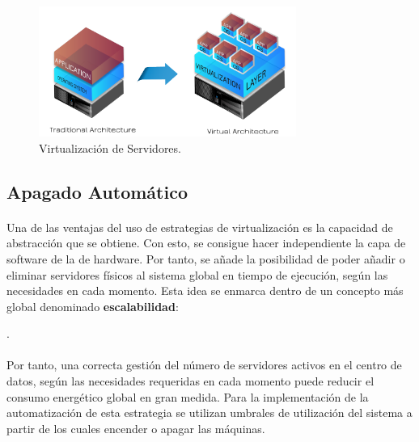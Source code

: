 \documentclass[10pt]{article}
\begin{document}
			\begin{figure}[htpb!]
				\begin{center}
					\includegraphics[width=0.75\textwidth]{virtualization}
					\caption{Virtualización de Servidores.\cite{exelos:virtualization}}
					\label{image:virtualization}
				\end{center}
			\end{figure}

		\subsection{Apagado Automático}

			\paragraph{}
			Una de las ventajas del uso de estrategias de virtualización es la capacidad de abstracción que se obtiene. Con esto, se consigue hacer independiente la capa de software de la de hardware. Por tanto, se añade la posibilidad de poder añadir o eliminar servidores físicos al sistema global en tiempo de ejecución, según las necesidades en cada momento. Esta idea se enmarca dentro de un concepto más global denominado \textbf{escalabilidad}:

			\cite{wikipedia:escalabilidad}.

			\paragraph{}
			Por tanto, una correcta gestión del número de servidores activos en el centro de datos, según las necesidades requeridas en cada momento puede reducir el consumo energético global en gran medida. Para la implementación de la automatización de esta estrategia se utilizan umbrales de utilización del sistema a partir de los cuales encender o apagar las máquinas.
\end{document}

